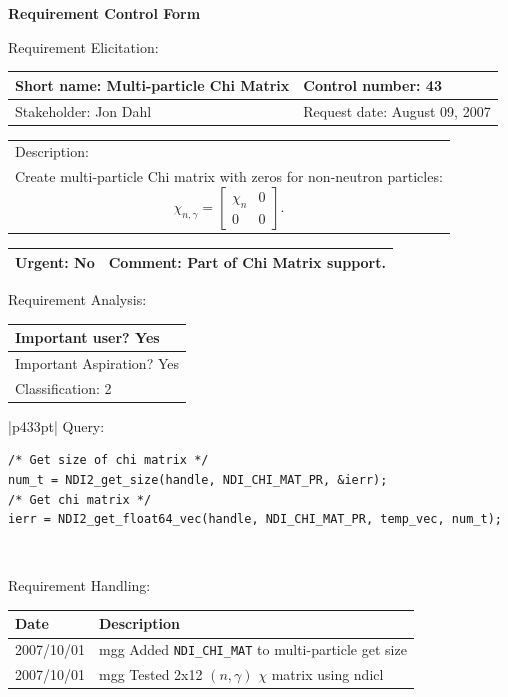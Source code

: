 \begin{center}\Large\bf
Requirement Control Form
\end{center}
\vspace{24pt}

Requirement Elicitation:

\begin{tabular}{|p{211pt}|p{211pt}|} \hline
Short name: Multi-particle Chi Matrix & Control number: 43\\ \hline
Stakeholder: Jon Dahl & Request date: August 09, 2007\\
\end{tabular}
\begin{tabular}{|p{433pt}|} \hline
Description: \\ 
Create multi-particle Chi matrix with zeros for non-neutron
particles:
\begin{displaymath}
\chi_{n,\gamma} = \left[ \begin{array}{cc}
    \chi_{n} & 0 \\
    0 & 0
    \end{array} \right].
\end{displaymath} \\
\hline
\end{tabular} 
\begin{tabular}{|p{211pt}|p{211pt}|} \hline
Urgent: No & Comment: Part of Chi Matrix support. \\ \hline
\end{tabular}

\vspace{24pt}

Requirement Analysis:

\begin{tabular}{|p{433pt}|} \hline
Important user? Yes \\ \hline
Important Aspiration? Yes \\ \hline
Classification: 2 \\ \hline
\end{tabular}
\vspace{12pt}

\begin{tabular}{|p{433pt}|} \hline
Query:
\begin{verbatim}
/* Get size of chi matrix */
num_t = NDI2_get_size(handle, NDI_CHI_MAT_PR, &ierr);
/* Get chi matrix */
ierr = NDI2_get_float64_vec(handle, NDI_CHI_MAT_PR, temp_vec, num_t);
\end{verbatim}
\\ \hline

\end{tabular}
\vspace{24pt}

Requirement Handling:

\begin{tabular}{|p{72pt}|p{351pt}|} \hline
Date & Description \\ \hline
2007/10/01 & mgg Added \texttt{NDI\_CHI\_MAT} to multi-particle get
size \\ \hline 
2007/10/01 & mgg Tested 2x12 $(n,\gamma)$ $\chi$ matrix using ndicl \\
\hline 
\end{tabular}
